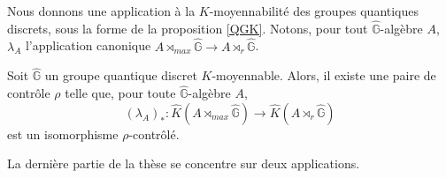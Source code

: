 \begin{itemize}
Nous donnons une application à la $K$-moyennabilité des groupes quantiques discrets, sous la forme de la proposition \ref{QGK}. Notons, pour tout $\hat{\mathbb G}$-algèbre $A$, $\lambda_A$ l'application canonique $A\rtimes_{max} \hat{\mathbb G} \rightarrow A \rtimes_r \hat{\mathbb G}$.\\

\begin{propfr}
Soit $\hat{\mathbb G}$ un groupe quantique discret $K$-moyennable. Alors, il existe une paire de contrôle $\rho$ telle que, pour toute $\hat{\mathbb G}$-algèbre $A$,
\[(\lambda_A)_* : \hat K(A\rtimes_{max} \hat{\mathbb G}) \rightarrow \hat K(A\rtimes_r \hat{\mathbb G}) \]
est un isomorphisme $\rho$-contrôlé.\\
\end{propfr}
\end{itemize}

La dernière partie de la thèse se concentre sur deux applications. \\

